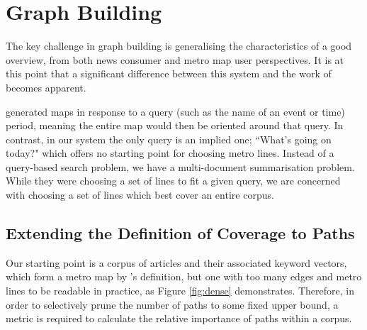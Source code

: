 \clearpage

\section{Graph Building} 

The key challenge in graph building is generalising the characteristics of a good overview, from both news consumer and metro map user perspectives. It is at this point that a significant difference between this system and the work of \cite{MetroMapsOfScience, GeneratingInformationMaps, InformationCartographyPre} becomes apparent. 

\citeauthor{GeneratingInformationMaps} generated maps in response to a query (such as the name of an event or time) period, meaning the entire map would then be oriented around that query. In contrast, in our system the only query is an implied one; ``What's going on today?" which offers no starting point for choosing metro lines. Instead of a query-based search problem, we have a multi-document summarisation problem. While they were choosing a set of lines to fit a given query, we are concerned with choosing a set of lines which best cover an entire corpus.

\subsection{Extending the Definition of Coverage to Paths}\label{sec:linecoverage}

Our starting point is a corpus of articles and their associated keyword vectors, which form a metro map by \citeauthor{GeneratingInformationMaps}'s definition, but one with too many edges and metro lines to be readable in practice, as Figure \ref{fig:dense} demonstrates. Therefore, in order to selectively prune the number of paths to some fixed upper bound, a metric is required to calculate the relative importance of paths within a corpus.

